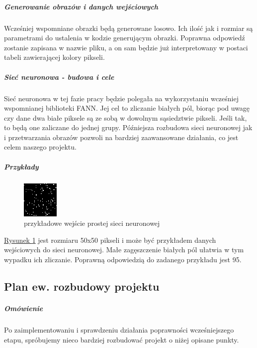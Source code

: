 \documentclass{article}
\begin{document}
\subparagraph{Generowanie obrazów i danych wejściowych} Wcześniej wspomniane obrazki będą generowane losowo. Ich ilość jak i rozmiar są parametrami do ustalenia w kodzie generującym obrazki. Poprawna odpowiedź zostanie zapisana w nazwie pliku, a on sam będzie już interpretowany w postaci tabeli zawierającej kolory pikseli.

\subparagraph{Sieć neuronowa - budowa i cele} Sieć neuronowa w tej fazie pracy będzie polegała na wykorzystaniu wcześniej wspomnianej biblioteki FANN. Jej cel to zliczanie białych pól, biorąc pod uwagę czy dane dwa białe piksele są ze sobą w dowolnym sąsiedztwie pikseli. Jeśli tak, to będą one zaliczane do jednej grupy.  Późniejsza rozbudowa sieci neuronowej jak i przetwarzania obrazów pozwoli na bardziej zaawansowane działania, co jest celem naszego projektu.

\subparagraph{Przykłady}
\begin{figure}
\begin{center}
\includegraphics[scale=1]{przyklad.png}
\end{center}
\caption{przykładowe wejście prostej sieci neuronowej}
\label{fig:przyklad_prostego_wejscia}
\end{figure}
\hyperref[fig:przyklad_prostego_wejscia]{Rysunek \ref*{fig:przyklad_prostego_wejscia}} jest rozmiaru 50x50 pikseli i może być przykładem danych wejściowych do sieci neuronowej. Małe zagęszczenie białych pól ułatwia w tym wypadku ich zliczanie. Poprawną odpowiedzią do zadanego przykładu jest 95. 

\subsection{Plan ew. rozbudowy projektu}
\subparagraph{Omówienie} Po zaimplementowaniu i sprawdzeniu działania poprawności wcześniejszego etapu, spróbujemy nieco bardziej rozbudować projekt o niżej opisane punkty.
\end{document}
